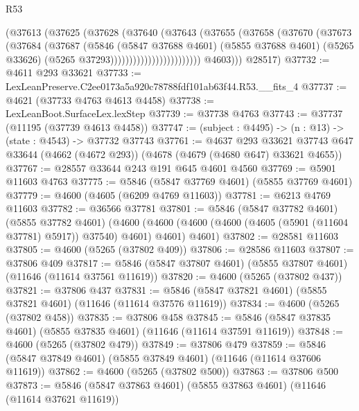\begin{lexlean}{R53}
\begin{coremodule}
                                  (@37613
                                    (@37625
                                      (@37628
                                        (@37640
                                          (@37643
                                            (@37655
                                              (@37658
                                                (@37670
                                                  (@37673
                                                    (@37684
                                                      (@37687
                                                        (@5846
                                                          (@5847 @37688 @4601)
                                                          (@5855 @37688 @4601)
                                                          (@5265 @33626)
                                                          (@5265 @37293))))))))))))))))))))))))
            @4603)))
      @28517)
@37732 := @4611 @293 @33621
@37733 := LexLeanPreserve.C2ee0173a5a920c78788fdf101ab63f44.R53.__fits_4
@37737 := @4621 (@37733 @4763 @4613 @4458)
@37738 := LexLeanBoot.SurfaceLex.lexStep
@37739 := @37738 @4763
@37743 := @37737 (@11195 (@37739 @4613 @4458))
@37747 := (subject : @4495) -> (n : @13) -> (state : @4543) -> @37732 @37743
@37761 := @4637
    @293
    @33621
    @37743
    @647
    @33644
    (@4662 (@4672 @293))
    (@4678 (@4679 (@4680 @647) @33621 @4655))
@37767 := @28557 @33644 @243 @191 @645 @4601 @4560
@37769 := @5901 @11603 @4763
@37775 := @5846 (@5847 @37769 @4601) (@5855 @37769 @4601)
@37779 := @4600 (@4605 (@6209 @4769 @11603))
@37781 := @6213 @4769 @11603
@37782 := @36566 @37781
@37801 := @5846
    (@5847 @37782 @4601)
    (@5855 @37782 @4601)
    (@4600 (@4600 (@4600 (@4600 (@4605 (@5901 (@11604 @37781) @5917)) @37540) @4601) @4601) @4601)
@37802 := @28581 @11603
@37805 := @4600 (@5265 (@37802 @409))
@37806 := @28586 @11603
@37807 := @37806 @409
@37817 := @5846 (@5847 @37807 @4601) (@5855 @37807 @4601) (@11646 (@11614 @37561 @11619))
@37820 := @4600 (@5265 (@37802 @437))
@37821 := @37806 @437
@37831 := @5846 (@5847 @37821 @4601) (@5855 @37821 @4601) (@11646 (@11614 @37576 @11619))
@37834 := @4600 (@5265 (@37802 @458))
@37835 := @37806 @458
@37845 := @5846 (@5847 @37835 @4601) (@5855 @37835 @4601) (@11646 (@11614 @37591 @11619))
@37848 := @4600 (@5265 (@37802 @479))
@37849 := @37806 @479
@37859 := @5846 (@5847 @37849 @4601) (@5855 @37849 @4601) (@11646 (@11614 @37606 @11619))
@37862 := @4600 (@5265 (@37802 @500))
@37863 := @37806 @500
@37873 := @5846 (@5847 @37863 @4601) (@5855 @37863 @4601) (@11646 (@11614 @37621 @11619))

\end{coremodule}
\end{lexlean}
